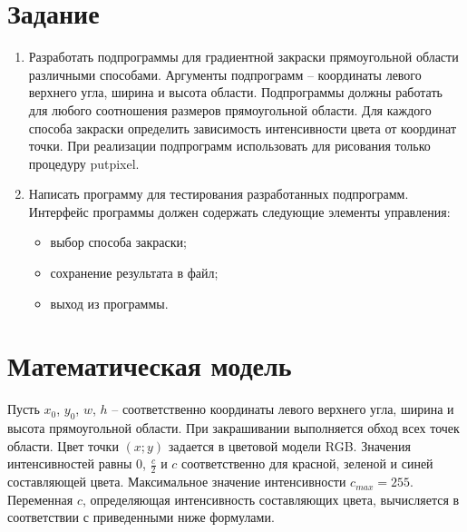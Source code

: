 \documentclass[14pt, a4paper]{extreport}
\begin{document}
\author{Олейников~Е.О.}
\maketitle

\chapter{Задание}

\begin{enumerate}

	\item
	Разработать подпрограммы для градиентной закраски прямоугольной области различными способами.
	Аргументы подпрограмм -- координаты левого верхнего угла, ширина и высота области.
	Подпрограммы должны работать для любого соотношения размеров прямоугольной области.
	Для каждого способа закраски определить зависимость интенсивности цвета от координат точки.
	При реализации подпрограмм использовать для рисования только процедуру putpixel.

	\item
	Написать программу для тестирования разработанных \linebreak подпрограмм.
	Интерфейс программы должен содержать следующие элементы управления:
	\begin{itemize}
		\item выбор способа закраски;
		\item сохранение результата в файл;
		\item выход из программы.
	\end{itemize}

\end{enumerate}

\chapter{Математическая модель}

Пусть $x_0$, $y_0$, $w$, $h$ -- соответственно координаты левого верхнего угла, ширина и высота прямоугольной области.
При закрашивании выполняется обход всех точек области.
Цвет точки $(x;y)$ задается в цветовой модели RGB.
Значения интенсивностей равны 0, $\frac{c}{2}$ и $c$ соответственно для красной, зеленой и синей составляющей цвета.
Максимальное значение интенсивности $c_{max} = 255$.
Переменная $c$, определяющая интенсивность составляющих цвета, вычисляется в соответствии с приведенными ниже формулами.
\end{document}
